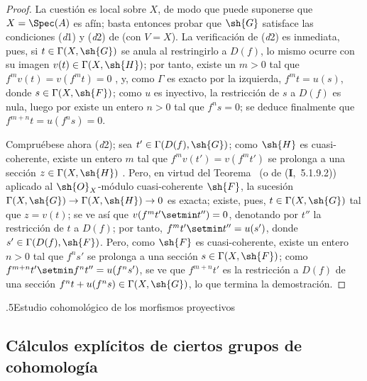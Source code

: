 \documentclass[oneside]{amsart}
\makeatletter
\renewcommand*{\section}{%
  \@startsection{section}{1}{\z@}{.7\linespacing\@plus\linespacing}%
  {.5\linespacing}{\normalfont\bfseries\Large\scshape\centering}}
\newcommand{\ega@arrow}[2]{\mathchoice{#1}{#2}{#2}{#2}}
\renewcommand{\to}{\ega@arrow{\longrightarrow}{\rightarrow}}
\newcommand{\oldpage}[2][]{{\marginnote{\normalfont\textbf{#1}~|~#2}}\ignorespaces}
\let\EGAOriginalLabel\label
\renewcommand{\label}[1]{\phantomsection\EGAOriginalLabel{#1}}
\makeatother
\begin{document}
\oldpage[III]{95}
\begin{proof}
La cuestión es local sobre $X$, de modo que puede suponerse que $X=\Spec(A)$ es afín; basta entonces probar que $\sh{G}$ satisface las condiciones (\textit{d}1) y (\textit{d}2) de  (con $V=X$).
La verificación de (\textit{d}2) es inmediata, pues, si $t\in\Gamma(X,\sh{G})$ se anula al restringirlo a $D(f)$, lo mismo ocurre con su imagen $v(t)\in\Gamma(X,\sh{H})$; por tanto, existe un $m>0$ tal que $f^m v(t)=v(f^m t)=0$ , y, como $\Gamma$ es exacto por la izquierda, $f^m t=u(s)$, donde $s\in\Gamma(X,\sh{F})$; como $u$ es inyectivo, la restricción de $s$ a $D(f)$ es nula, luego por  existe un entero $n>0$ tal que $f^n s=0$; se deduce finalmente que $f^{m+n}t=u(f^n s)=0$.

Compruébese ahora (\textit{d}2); sea $t'\in\Gamma(D(f),\sh{G})$; como $\sh{H}$ es cuasi-coherente, existe un entero $m$ tal que $f^m v(t')=v(f^m t')$ se prolonga a una sección $z\in\Gamma(X,\sh{H})$ .
Pero, en virtud del Teorema~ (o de (\textbf{I},~5.1.9.2)) aplicado al $\sh{O}_X$-módulo cuasi-coherente $\sh{F}$, la sucesión $\Gamma(X,\sh{G})\to\Gamma(X,\sh{H})\to 0$ es exacta; existe, pues, $t\in\Gamma(X,\sh{G})$ tal que $z=v(t)$; se ve así que $v(f^m t'\setmin t'')=0$, denotando por $t''$ la restricción de $t$ a $D(f)$; por tanto, $f^m t'\setmin t''=u(s')$, donde $s'\in\Gamma(D(f),\sh{F})$.
Pero, como $\sh{F}$ es cuasi-coherente, existe un entero $n>0$ tal que $f^n s'$ se prolonga a una sección $s\in\Gamma(X,\sh{F})$; como $f^{m+n}t'\setmin f^n t''=u(f^n s')$, se ve que $f^{m+n}t'$ es la restricción a $D(f)$ de una sección $f^n t+u(f^n s)\in\Gamma(X,\sh{G})$, lo que termina la demostración.
\end{proof}

\section{Estudio cohomológico de los morfismos proyectivos}
\label{section:III.2}


\subsection{Cálculos explícitos de ciertos grupos de cohomología}
\label{subsection:III.2.1}
\end{document}
